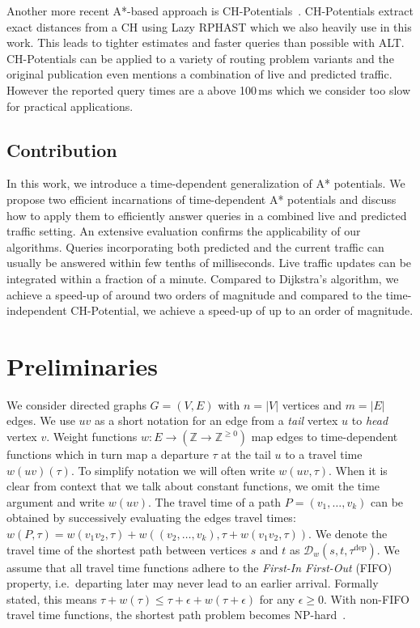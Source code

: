 \documentclass[a4paper,UKenglish,cleveref, autoref, thm-restate,anonymous]{lipics-v2021}
\newcommand*{\dist}{\mathcal{D}}
\newcommand*{\tdep}{\tau^{\operatorname{dep}}}
\begin{document}
Another more recent A*-based approach is CH-Potentials~\cite{strasser_et_al:LIPIcs.SEA.2021.6}.
CH-Potentials extract exact distances from a CH using Lazy RPHAST which we also heavily use in this work.
This leads to tighter estimates and faster queries than possible with ALT.
CH-Potentials can be applied to a variety of routing problem variants and the original publication even mentions a combination of live and predicted traffic.
However the reported query times are a above 100\,ms which we consider too slow for practical applications.

\subsection{Contribution}

In this work, we introduce a time-dependent generalization of A* potentials.
We propose two efficient incarnations of time-dependent A* potentials and discuss how to apply them to efficiently answer queries in a combined live and predicted traffic setting.
An extensive evaluation confirms the applicability of our algorithms.
Queries incorporating both predicted and the current traffic can usually be answered within few tenths of milliseconds.
Live traffic updates can be integrated within a fraction of a minute.
Compared to Dijkstra's algorithm, we achieve a speed-up of around two orders of magnitude and compared to the time-independent CH-Potential, we achieve a speed-up of up to an order of magnitude.

\section{Preliminaries}
We consider directed graphs $G=(V,E)$ with $n=|V|$ vertices and $m=|E|$ edges.
We use $uv$ as a short notation for an edge from a \emph{tail} vertex $u$ to \emph{head} vertex $v$.
Weight functions $w : E \to (\mathbb{Z} \to \mathbb{Z}^{\geq 0})$ map edges to time-dependent functions which in turn map a departure $\tau$ at the tail $u$ to a travel time $w(uv)(\tau)$.
To simplify notation we will often write $w(uv, \tau)$.
When it is clear from context that we talk about constant functions, we omit the time argument and write $w(uv)$.
The travel time of a path $P = (v_1,\dots,v_k)$ can be obtained by successively evaluating the edges travel times: $w(P, \tau) = w(v_1 v_2, \tau) + w((v_2,\dots,v_k), \tau + w(v_1 v_2, \tau))$.
We denote the travel time of the shortest path between vertices $s$ and $t$ as $\dist_w(s,t,\tdep)$.
We assume that all travel time functions adhere to the \emph{First-In First-Out} (FIFO) property, i.e.\ departing later may never lead to an earlier arrival.
Formally stated, this means $\tau + w(\tau) \leq \tau + \epsilon + w(\tau + \epsilon)$ for any $\epsilon \geq 0$.
With non-FIFO travel time functions, the shortest path problem becomes \textsf{NP}-hard~\cite{or-tnp-89}.
\end{document}

